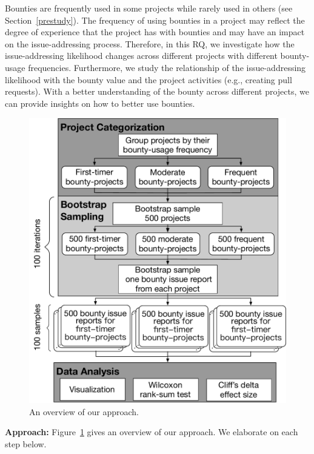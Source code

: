
Bounties are frequently used in some projects while rarely used in others (see Section~\ref{prestudy}). The frequency of using bounties in a project may reflect the degree of experience that the project has with bounties and may have an impact on the issue-addressing process.
Therefore, in this RQ, we investigate how the issue-addressing likelihood changes across different projects with different bounty-usage frequencies. Furthermore, we study the relationship of the issue-addressing likelihood with the bounty value and the project activities (e.g., creating pull requests).
With a better understanding of the bounty across different projects, we can provide insights on how to better use bounties.%



\begin{figure}[t]
\centering\includegraphics[width=\columnwidth ]{pics/rq1/new/approach}
\caption{An overview of our approach. }
\label{fig:rq1_approach}
\vspace{-0.2in}

\end{figure}

\noindent\textbf{Approach:} Figure~\ref{fig:rq1_approach} gives an overview of our approach. We elaborate on each step below.

